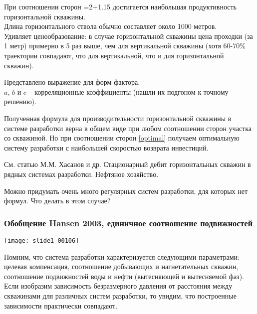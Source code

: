 \documentclass[main.tex]{subfiles}
\begin{document}
При соотношении сторон
\beq\label{optimal}
=2+1.15\cdot{}
\eeq
достигается наибольшая продуктивность горизонтальной скважины.\\

Длина горизонтального ствола обычно составляет около 1000 метров.\\

Удивляет ценообразование: в случае горизонтальной скважины цена проходки (за 1 метр) примерно в 5 раз выше, чем для вертикальной скважины (хотя 60-70\% траектории совпадают, что для вертикальной, что и для горизонтальной скважин).


Представлено выражение для форм фактора.\\

$a$, $b$ и $c$ -- корреляционные коэффициенты (нашли их подгоном к точному решению).

Полученная формула для производительности горизонтальной скважины в системе разработки верна в общем виде при любом соотношении сторон участка со скважиной. Но при соотношении сторон \eqref{optimal} получаем оптимальную систему разработки с наибольшей скоростью возврата инвестиций.


См. статью М.М. Хасанов и др. Стационарный дебит горизонтальных скважин в рядных системах разработки. Нефтяное хозяйство.


Можно придумать очень много регулярных систем разработки, для которых нет формул. Что делать в этом случае?

\subsubsection{Обобщение Hansen 2003, единичное соотношение подвижностей}

\texttt{[image: slide1\_00106]}

Помним, что система разработки характеризуется следующими параметрами: целевая компенсация, соотношение добывающих и нагнетательных скважин, соотношение подвижностей воды и нефти (вытесняющей и вытесняемой фаз).\\

Если изобразим зависимость безразмерного давления от расстояния между скважинами для различных систем разработки, то увидим, что построенные зависимости практически совпадают.
\end{document}
